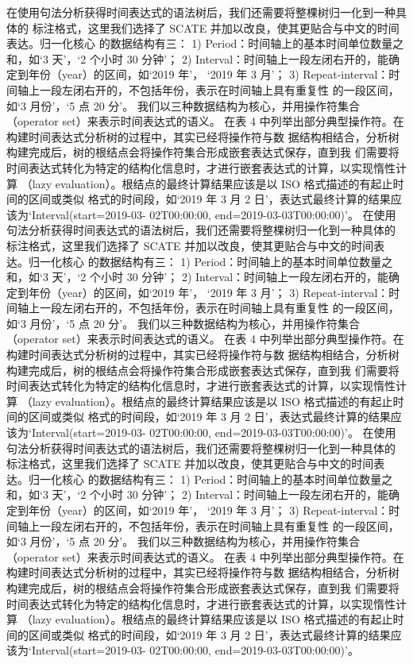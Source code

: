 在使用句法分析获得时间表达式的语法树后，我们还需要将整棵树归一化到一种具体的
标注格式，这里我们选择了 SCATE 并加以改良，使其更贴合与中文的时间表达。归一化核心
的数据结构有三：
1) Period：时间轴上的基本时间单位数量之和，如‘3 天’，‘2 个小时 30 分钟’；
2) Interval：时间轴上一段左闭右开的，能确定到年份（year）的区间，如‘2019 年’，
‘2019 年 3 月’；
3) Repeat-interval：时间轴上一段左闭右开的，不包括年份，表示在时间轴上具有重复性
的一段区间，如‘3 月份’，‘5 点 20 分’。
我们以三种数据结构为核心，并用操作符集合（operator set）来表示时间表达式的语义。
在表 4 中列举出部分典型操作符。在构建时间表达式分析树的过程中，其实已经将操作符与数
据结构相结合，分析树构建完成后，树的根结点会将操作符集合形成嵌套表达式保存，直到我
们需要将时间表达式转化为特定的结构化信息时，才进行嵌套表达式的计算，以实现惰性计算
（lazy evaluation）。根结点的最终计算结果应该是以 ISO 格式描述的有起止时间的区间或类似
格式的时间段，如‘2019 年 3 月 2 日’，表达式最终计算的结果应该为‘Interval(start=2019-03-
02T00:00:00, end=2019-03-03T00:00:00)’。
在使用句法分析获得时间表达式的语法树后，我们还需要将整棵树归一化到一种具体的
标注格式，这里我们选择了 SCATE 并加以改良，使其更贴合与中文的时间表达。归一化核心
的数据结构有三：
1) Period：时间轴上的基本时间单位数量之和，如‘3 天’，‘2 个小时 30 分钟’；
2) Interval：时间轴上一段左闭右开的，能确定到年份（year）的区间，如‘2019 年’，
‘2019 年 3 月’；
3) Repeat-interval：时间轴上一段左闭右开的，不包括年份，表示在时间轴上具有重复性
的一段区间，如‘3 月份’，‘5 点 20 分’。
我们以三种数据结构为核心，并用操作符集合（operator set）来表示时间表达式的语义。
在表 4 中列举出部分典型操作符。在构建时间表达式分析树的过程中，其实已经将操作符与数
据结构相结合，分析树构建完成后，树的根结点会将操作符集合形成嵌套表达式保存，直到我
们需要将时间表达式转化为特定的结构化信息时，才进行嵌套表达式的计算，以实现惰性计算
（lazy evaluation）。根结点的最终计算结果应该是以 ISO 格式描述的有起止时间的区间或类似
格式的时间段，如‘2019 年 3 月 2 日’，表达式最终计算的结果应该为‘Interval(start=2019-03-
02T00:00:00, end=2019-03-03T00:00:00)’。
在使用句法分析获得时间表达式的语法树后，我们还需要将整棵树归一化到一种具体的
标注格式，这里我们选择了 SCATE 并加以改良，使其更贴合与中文的时间表达。归一化核心
的数据结构有三：
1) Period：时间轴上的基本时间单位数量之和，如‘3 天’，‘2 个小时 30 分钟’；
2) Interval：时间轴上一段左闭右开的，能确定到年份（year）的区间，如‘2019 年’，
‘2019 年 3 月’；
3) Repeat-interval：时间轴上一段左闭右开的，不包括年份，表示在时间轴上具有重复性
的一段区间，如‘3 月份’，‘5 点 20 分’。
我们以三种数据结构为核心，并用操作符集合（operator set）来表示时间表达式的语义。
在表 4 中列举出部分典型操作符。在构建时间表达式分析树的过程中，其实已经将操作符与数
据结构相结合，分析树构建完成后，树的根结点会将操作符集合形成嵌套表达式保存，直到我
们需要将时间表达式转化为特定的结构化信息时，才进行嵌套表达式的计算，以实现惰性计算
（lazy evaluation）。根结点的最终计算结果应该是以 ISO 格式描述的有起止时间的区间或类似
格式的时间段，如‘2019 年 3 月 2 日’，表达式最终计算的结果应该为‘Interval(start=2019-03-
02T00:00:00, end=2019-03-03T00:00:00)’。

